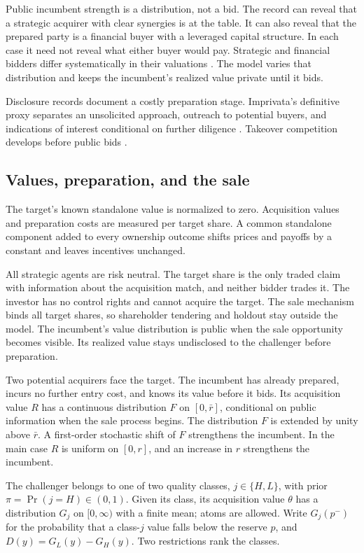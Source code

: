 Public incumbent strength is a distribution, not a bid. The record can reveal that a strategic acquirer with
clear synergies is at the table. It can also reveal that the prepared party is a financial buyer with a
leveraged capital structure. In each case it need not reveal what either buyer would pay. Strategic and
financial bidders differ systematically in their valuations \citep{GorbenkoMalenko2014}. The model varies that
distribution and keeps the incumbent's realized value private until it bids.

Disclosure records document a costly preparation stage. Imprivata's definitive proxy separates an unsolicited
approach, outreach to potential buyers, and indications of interest conditional on further diligence
\citep{Imprivata2016}. Takeover competition develops before public bids
\citep{BooneMulherin2007,GentryStroup2019}.

\subsection{Values, preparation, and the sale}\label{sec:values}

The target's known standalone value is normalized to zero. Acquisition values and preparation costs are
measured per target share. A common standalone component added to every ownership outcome shifts prices and
payoffs by a constant and leaves incentives unchanged.

All strategic agents are risk neutral. The target share is the only traded claim with information about the
acquisition match, and neither bidder trades it. The investor has no control rights and cannot acquire the
target. The sale mechanism binds all target shares, so shareholder tendering and holdout stay outside the
model. The incumbent's value distribution is public when the sale opportunity becomes visible. Its realized
value stays undisclosed to the challenger before preparation.

Two potential acquirers face the target. The incumbent has already prepared, incurs no further entry cost, and
knows its value before it bids. Its acquisition value \(R\) has a continuous distribution \(F\) on
\([0,\bar r]\), conditional on public information when the sale process begins. The distribution \(F\) is
extended by unity above \(\bar r\). A first-order
stochastic shift of \(F\) strengthens the incumbent. In the main case \(R\) is uniform on \([0,r]\), and an
increase in \(r\) strengthens the incumbent.

The challenger belongs to one of two quality classes, \(j\in\{H,L\}\), with prior \(\pi=\Pr(j=H)\in(0,1)\).
Given its class, its acquisition value \(\theta\) has a distribution \(G_j\) on \([0,\infty)\) with a finite
mean; atoms are allowed. Write \(G_j(p^-)\) for the probability that a class-\(j\) value falls below the
reserve \(p\), and \(D(y)=G_L(y)-G_H(y)\). Two restrictions rank the classes.

